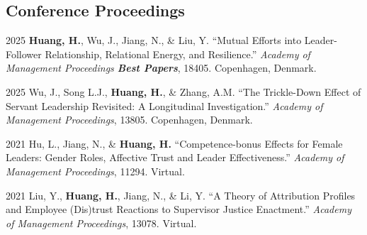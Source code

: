\documentclass[12pt,letterpaper]{report} %
\begin{document}




    \subsection*{Conference Proceedings}

    \begin{tablist}

        \item[2025]\tab{}\textbf{Huang, H.}, Wu, J., Jiang, N., \& Liu, Y. \enquote{Mutual Efforts into Leader-Follower Relationship, Relational Energy, and Resilience.} \textit{Academy of Management Proceedings \textbf{Best Papers}}, 18405. Copenhagen, Denmark.

        \item[2025]\tab{}Wu, J., Song L.J., \textbf{Huang, H.}, \& Zhang, A.M. \enquote{The Trickle-Down Effect of Servant Leadership Revisited: A Longitudinal Investigation.} \textit{Academy of Management Proceedings}, 13805. Copenhagen, Denmark.

        \item[2021]\tab{}Hu, L., Jiang, N., \& \textbf{Huang, H.} \enquote{Competence-bonus Effects for Female Leaders: Gender Roles, Affective Trust and Leader Effectiveness.} \textit{Academy of Management Proceedings}, 11294. Virtual.

        \item[2021]\tab{}Liu, Y., \textbf{Huang, H.}, Jiang, N., \& Li, Y. \enquote{A Theory of Attribution Profiles and Employee (Dis)trust Reactions to Supervisor Justice Enactment.} \textit{Academy of Management Proceedings}, 13078. Virtual.


    \end{tablist}
\end{document}
